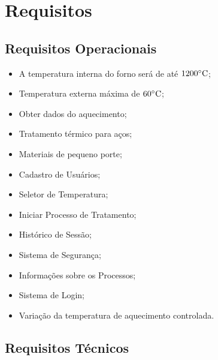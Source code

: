 \section{Requisitos}

\subsection{Requisitos Operacionais}

\begin{itemize}
	\item A temperatura interna do forno será de até $1200 \degree \text{C}$;
	\item Temperatura externa máxima de $60 \degree \text{C}$;
	\item Obter dados do aquecimento;
	\item Tratamento térmico para aços;
	\item Materiais de pequeno porte;
	\item Cadastro de Usuários;
	\item Seletor de Temperatura;
	\item Iniciar Processo de Tratamento;
	\item Histórico de Sessão;
	\item Sistema de Segurança;
	\item Informações sobre os Processos;
	\item Sistema de Login;
	\item Variação da temperatura de aquecimento controlada.
\end{itemize}

\subsection{Requisitos Técnicos}

